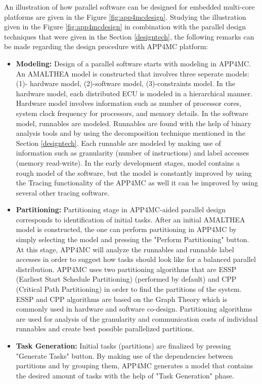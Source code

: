 An illustration of how parallel software can be designed for embedded multi-core platforms are given in the Figure \ref{fig:app4mcdesign}. Studying the illustration given in the Figure \ref{fig:app4mcdesign} in combination with the parallel design techniques that were given in the Section \ref{designtech}, the following remarks can be made regarding the design procedure with APP4MC platform:
\begin{itemize}
	\item \textbf{Modeling:} Design of a parallel software starts with modeling in APP4MC. An AMALTHEA model is constructed that involves three seperate models: (1)- hardware model, (2)-software model, (3)-constraints model. In the hardware model, each distributed ECU is modeled in a hierarchical  manner. Hardware model involves information such as number of processor cores, system clock frequency for processors, and memory details. In the software model, runnables are modeled. Runnables are found with the help of binary analysis tools and by using the decomposition technique mentioned in the Section \ref{designtech}. Each runnable are modeled by making use of information such as granularity (number of instructions) and label accesses (memory read-write). In the early development stages, model contains a rough model of the software, but the model is constantly improved by using the Tracing functionality of the APP4MC as well it can be improved by using several other tracing software.
	\item \textbf{Partitioning:} Partitioning stage in APP4MC-aided parallel design corresponds to identification of initial tasks. After an initial AMALTHEA model is constructed, the one can perform partitioning in APP4MC by simply selecting the model and pressing the "Perform Partitioning" button. At this stage, APP4MC will analyze the runnables and runnable label accesses in order to suggest how tasks should look like for a balanced parallel distribution. APP4MC uses two partitioning algorithms that are ESSP (Earliest Start Schedule Partitioning) (performed by default) and CPP (Critical Path Partitioning) in order to find the partitions of the system. ESSP and CPP algorithms are based on the Graph Theory \cite{graphtheory} which is commonly used in hardware and software co-design. Partitioning algorithms are used for analysis of the granularity and communication costs of individual runnables and create best possible parallelized partitions.
	\item \textbf{Task Generation:} Initial tasks (partitions) are finalized by pressing "Generate Tasks" button. By making use of the dependencies between partitions and by grouping them, APP4MC generates a model that contains the desired amount of tasks with the help of "Task Generation" phase. 

\end{itemize}

